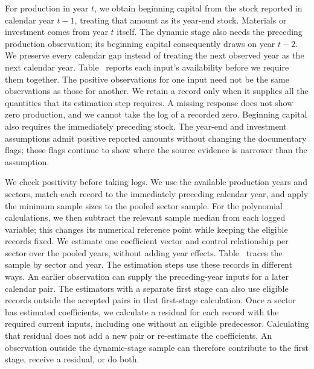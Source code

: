 For production in year $t$, we obtain beginning capital from the stock reported in calendar year $t-1$, treating that amount as its year-end stock. Materials or investment comes from year $t$ itself. The dynamic stage also needs the preceding production observation; its beginning capital consequently draws on year $t-2$. We preserve every calendar gap instead of treating the next observed year as the next calendar year. Table~ reports each input's availability before we require them together.
The positive observations for one input need not be the same observations as those for another. We retain a record only when it supplies all the quantities that its estimation step requires. A missing response does not show zero production, and we cannot take the log of a recorded zero. Beginning capital also requires the immediately preceding stock. The year-end and investment assumptions admit positive reported amounts without changing the documentary flags; those flags continue to show where the source evidence is narrower than the assumption.

We check positivity before taking logs. We use the available production years and sectors, match each record to the immediately preceding calendar year, and apply the minimum sample sizes to the pooled sector sample. For the polynomial calculations, we then subtract the relevant sample median from each logged variable; this changes its numerical reference point while keeping the eligible records fixed. We estimate one coefficient vector and control relationship per sector over the pooled years, without adding year effects. Table~ traces the sample by sector and year.
The estimation steps use these records in different ways. An earlier observation can supply the preceding-year inputs for a later calendar pair. The estimators with a separate first stage can also use eligible records outside the accepted pairs in that first-stage calculation. Once a sector has estimated coefficients, we calculate a residual for each record with the required current inputs, including one without an eligible predecessor. Calculating that residual does not add a new pair or re-estimate the coefficients. An observation outside the dynamic-stage sample can therefore contribute to the first stage, receive a residual, or do both.


